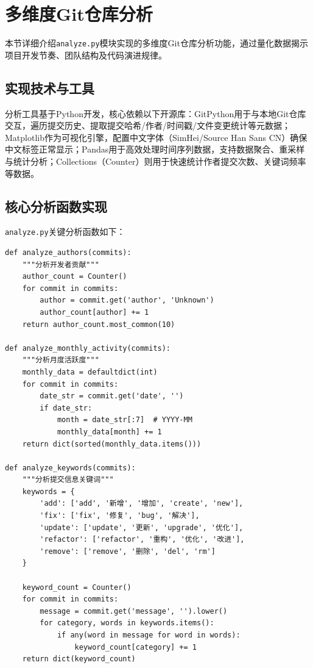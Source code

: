 \section{多维度Git仓库分析}

本节详细介绍\texttt{analyze.py}模块实现的多维度Git仓库分析功能，通过量化数据揭示项目开发节奏、团队结构及代码演进规律。

\subsection{实现技术与工具}

分析工具基于Python开发，核心依赖以下开源库：GitPython用于与本地Git仓库交互，遍历提交历史、提取提交哈希/作者/时间戳/文件变更统计等元数据；Matplotlib作为可视化引擎，配置中文字体（SimHei/Source Han Sans CN）确保中文标签正常显示；Pandas用于高效处理时间序列数据，支持数据聚合、重采样与统计分析；Collections（Counter）则用于快速统计作者提交次数、关键词频率等数据。

\subsection{核心分析函数实现}

\texttt{analyze.py}关键分析函数如下：

\begin{verbatim}
def analyze_authors(commits):
    """分析开发者贡献"""
    author_count = Counter()
    for commit in commits:
        author = commit.get('author', 'Unknown')
        author_count[author] += 1
    return author_count.most_common(10)

def analyze_monthly_activity(commits):
    """分析月度活跃度"""
    monthly_data = defaultdict(int)
    for commit in commits:
        date_str = commit.get('date', '')
        if date_str:
            month = date_str[:7]  # YYYY-MM
            monthly_data[month] += 1
    return dict(sorted(monthly_data.items()))

def analyze_keywords(commits):
    """分析提交信息关键词"""
    keywords = {
        'add': ['add', '新增', '增加', 'create', 'new'],
        'fix': ['fix', '修复', 'bug', '解决'],
        'update': ['update', '更新', 'upgrade', '优化'],
        'refactor': ['refactor', '重构', '优化', '改进'],
        'remove': ['remove', '删除', 'del', 'rm']
    }

    keyword_count = Counter()
    for commit in commits:
        message = commit.get('message', '').lower()
        for category, words in keywords.items():
            if any(word in message for word in words):
                keyword_count[category] += 1
    return dict(keyword_count)
\end{verbatim}

